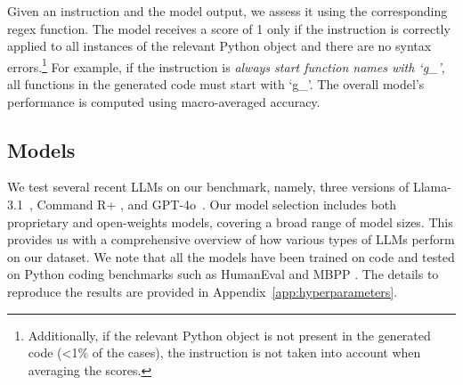 Given an instruction and the model output, we assess it using the corresponding regex function. 
The model receives a score of 1 only if the instruction is correctly applied to all instances of the relevant Python object and there are no syntax errors.\footnote{Additionally, if the relevant Python object is not present in the generated code (<1\% of the cases), the instruction is not taken into account when averaging the scores.} For example, if the instruction is \textit{always start function names with `g\_'}, all functions in the generated code must start with `g\_'.
The overall model's performance is computed using macro-averaged accuracy.



\subsection{Models}

We test several recent LLMs on our benchmark, namely, three versions of Llama-3.1~\cite[8B-Instruct, 70B-Instruct, and 405B-Instruct;][]{dubey2024llama},
Command R+ \citep{cohere2024}, and GPT-4o~\citep{openai2024}. Our model selection includes both proprietary and open-weights models, covering a broad range of model sizes. 
This provides us with a comprehensive overview of how various types of LLMs perform on our dataset. We note that all the models have been trained on code and tested on Python coding benchmarks such as HumanEval \citep{chen2021evaluating} and MBPP \citep{austin2021program}. The details to reproduce the results are provided in Appendix~\ref{app:hyperparameters}. %


